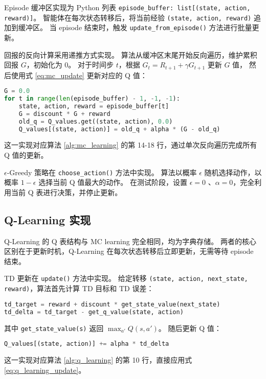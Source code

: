 Episode 缓冲区实现为 Python 列表 \texttt{episode\_buffer: list[(state, action, reward)]}。
智能体在每次状态转移后，将当前经验 \texttt{(state, action, reward)} 追加到缓冲区。
当 episode 结束时，触发 \texttt{update\_from\_episode()} 方法进行批量更新。

回报的反向计算采用递推方式实现。
算法从缓冲区末尾开始反向遍历，维护累积回报 $G$，初始化为 0。
对于时间步 $t$，根据 $G_t = R_{t+1} + \gamma G_{t+1}$ 更新 $G$ 值，
然后使用式 \eqref{eq:mc_update} 更新对应的 Q 值：
\begin{lstlisting}[language=Python, basicstyle=\small\ttfamily]
G = 0.0
for t in range(len(episode_buffer) - 1, -1, -1):
    state, action, reward = episode_buffer[t]
    G = discount * G + reward
    old_q = Q_values.get((state, action), 0.0)
    Q_values[(state, action)] = old_q + alpha * (G - old_q)
\end{lstlisting}
这一实现对应算法 \ref{alg:mc_learning} 的第 14-18 行，通过单次反向遍历完成所有 Q 值的更新。

$\epsilon$-Greedy 策略在 \texttt{choose\_action()} 方法中实现。
算法以概率 $\epsilon$ 随机选择动作，以概率 $1-\epsilon$ 选择当前 Q 值最大的动作。
在测试阶段，设置 $\epsilon = 0$ 、$\alpha = 0$，完全利用当前 Q 表进行决策，并停止更新。

\subsection{Q-Learning 实现}

Q-Learning 的 Q 表结构与 MC learning 完全相同，均为字典存储。
两者的核心区别在于更新时机，Q-Learning 在每次状态转移后立即更新，无需等待 episode 结束。


TD 更新在 \texttt{update()} 方法中实现。
给定转移 \texttt{(state, action, next\_state, reward)}，算法首先计算 TD 目标和 TD 误差：
\begin{lstlisting}[language=Python, basicstyle=\small\ttfamily]
td_target = reward + discount * get_state_value(next_state)
td_delta = td_target - get_q_value(state, action)
\end{lstlisting}
其中 \texttt{get\_state\_value(s)} 返回 $\max_{a'} Q(s, a')$。
随后更新 Q 值：
\begin{lstlisting}[language=Python, basicstyle=\small\ttfamily]
Q_values[(state, action)] += alpha * td_delta
\end{lstlisting}
这一实现对应算法 \ref{alg:q_learning} 的第 10 行，直接应用式 \eqref{eq:q_learning_update}。

